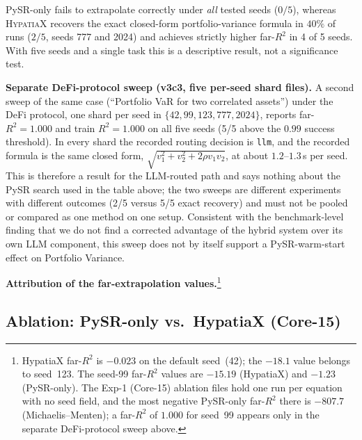 \documentclass[twoside,11pt]{article}
\newcommand{\Rsq}{R^{2}}
\begin{document}
PySR-only fails to extrapolate correctly under \emph{all} tested seeds ($0/5$),
whereas \textsc{HypatiaX} recovers the exact closed-form portfolio-variance formula
in $40\%$ of runs ($2/5$, seeds 777 and 2024) and achieves strictly higher far-$\Rsq$
in 4 of 5 seeds.  With five seeds and a single task this is a descriptive result, not a
significance test.


\textbf{Separate DeFi-protocol sweep (v3c3, five per-seed shard files).}
A second sweep of the same case (``Portfolio VaR for two correlated assets'')
under the DeFi protocol, one shard per seed in $\{42, 99, 123, 777, 2024\}$,
reports far-$\Rsq = 1.000$ and train $\Rsq = 1.000$ on all five seeds (5/5 above
the $0.99$ success threshold). In every shard the recorded routing decision is
\texttt{llm}, and the recorded formula is the same closed form,
$\sqrt{v_1^2 + v_2^2 + 2\rho v_1 v_2}$, at about $1.2$--$1.3$\,s per seed. This is therefore
a result for the LLM-routed path and says nothing about the PySR search used in
the table above; the two sweeps are different experiments with different
outcomes (2/5 versus 5/5 exact recovery) and must not be pooled or compared
as one method on one setup. Consistent with the benchmark-level finding that we
do not find a corrected advantage of the hybrid system over its own LLM
component, this sweep does not by itself support a PySR-warm-start effect on
Portfolio Variance.

\textbf{Attribution of the far-extrapolation values.}\footnote{HypatiaX far-$\Rsq$ is $-0.023$ on the default seed~(42); the $-18.1$ value belongs to seed~123. The seed-99 far-$\Rsq$ values are $-15.19$ (HypatiaX) and $-1.23$ (PySR-only). The Exp-1 (Core-15) ablation files hold one run per equation with no seed field, and the most negative PySR-only far-$\Rsq$ there is $-807.7$ (Michaelis--Menten); a far-$\Rsq$ of $1.000$ for seed~99 appears only in the separate DeFi-protocol sweep above.}

\subsection{Ablation: PySR-only vs.\ HypatiaX (Core-15)}\label{subsec:ablation-pysronly-vs-hypatiax-core15}
\label{sec:ablation_core15}
\end{document}
